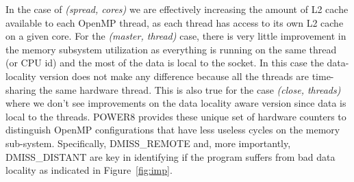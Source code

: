 In the case of  \textit{(spread, cores)} we are effectively increasing the amount of 
L2 cache available to each OpenMP thread, as each thread has access to its own L2 cache on a given core. 
For the \textit{(master, thread)} case, there is very little improvement in the memory subsystem utilization as everything is running on the same thread (or CPU id) and the most of the data is local to the socket. In this case the data-locality version does not make any difference because all the threads are time-sharing the same hardware thread. This is also true for the case  \textit{(close, threads)} where
 we don't see improvements on the data locality aware version since data is local to the threads. POWER8 provides these unique set of hardware counters to distinguish OpenMP configurations that have less useless cycles on the memory sub-system. Specifically, DMISS\_REMOTE and, more importantly, DMISS\_DISTANT are key in identifying if the program suffers from bad data locality as indicated in Figure~\ref{fig:imp}.


